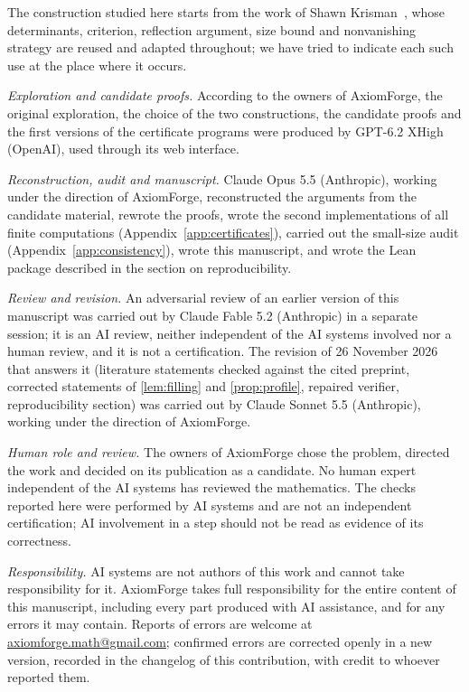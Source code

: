 
The construction studied here starts from the work of Shawn Krisman~\cite{Krisman2026chi2,
Krisman2026chi2small}, whose determinants, criterion, reflection argument, size bound and
nonvanishing strategy are reused and adapted throughout; we have tried to indicate each such use
at the place where it occurs.


\emph{Exploration and candidate proofs.} According to the owners of AxiomForge, the original
exploration, the choice of the two constructions, the candidate proofs and the first versions
of the certificate programs were produced by GPT-6.2 XHigh (OpenAI), used through its web
interface.

\emph{Reconstruction, audit and manuscript.} Claude Opus 5.5 (Anthropic), working under the
direction of AxiomForge, reconstructed the arguments from the candidate material, rewrote the
proofs, wrote the second implementations of all finite computations (Appendix~\ref{app:certificates}),
carried out the small-size audit (Appendix~\ref{app:consistency}), wrote this manuscript, and wrote the
Lean package described in the section on reproducibility.

\emph{Review and revision.} An adversarial review of an earlier version of this manuscript was
carried out by Claude Fable 5.2 (Anthropic) in a separate session; it is an AI review, neither
independent of the AI systems involved nor a human review, and it is not a certification. The
revision of 26 November 2026 that answers it (literature statements checked against the cited
preprint, corrected statements of \cref{lem:filling} and \cref{prop:profile}, repaired verifier,
reproducibility section) was carried out by Claude Sonnet 5.5 (Anthropic), working under the
direction of AxiomForge.

\emph{Human role and review.} The owners of AxiomForge chose the problem, directed the work and
decided on its publication as a candidate. No human expert independent of the AI systems has
reviewed the mathematics. The checks reported here were performed by AI systems and are not an
independent certification; AI involvement in a step should not be read as evidence of its
correctness.

\emph{Responsibility.} AI systems are not authors of this work and cannot take responsibility
for it. AxiomForge takes full responsibility for the entire content of this manuscript,
including every part produced with AI assistance, and for any errors it may contain. Reports
of errors are welcome at \href{mailto:axiomforge.math@gmail.com}{axiomforge.math@gmail.com};
confirmed errors are corrected openly in a new version, recorded in the changelog of this
contribution, with credit to whoever reported them.
